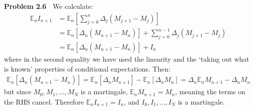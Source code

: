 \documentclass[12pt, letterpaper]{article}
\begin{document}
\vspace{5mm}
\noindent
\textbf{Problem 2.6} $\;$ We calculate:
\begin{align*}
    \mathbb E_n I_{n+1} &= \mathbb E_n \left[ \sum_{j=0}^n \Delta_j (M_{j+1} - M_j) \right] \\
    &= \mathbb E_n \left[ \Delta_n (M_{n+1} - M_n) \right] + \sum_{j=0}^{n-1} \Delta_j (M_{j+1} - M_j) \\
    &= \mathbb E_n \left[ \Delta_n (M_{n+1} - M_n) \right] + I_n
\end{align*}
where in the second equality we have used the linearity and the `taking out what is known' properties of conditional expectations.
Then:
\begin{gather*}
    \mathbb E_n \left[ \Delta_n (M_{n+1} - M_n) \right] = \mathbb E_n \left[ \Delta_n M_{n+1} \right] - \mathbb E_n \left[\Delta_n  M_n \right] = \Delta_n \mathbb E_n M_{n+1} - \Delta_n M_n
\end{gather*}
but since $M_0, M_1, \dots, M_N$ is a martingale, $\mathbb E_n M_{n+1} = M_n$, meaning the terms on the RHS cancel.
Therefore $\mathbb E_n I_{n+1} = I_n$, and $I_0, I_1, \dots, I_N$ is a martingale.

\rightline{$\square$}
\end{document}
